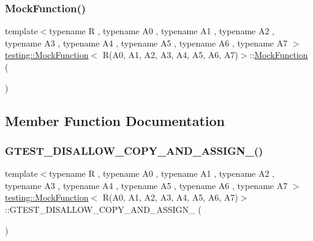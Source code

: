 \subsubsection{\texorpdfstring{MockFunction()}{MockFunction()}}
{\footnotesize\ttfamily template$<$typename R , typename A0 , typename A1 , typename A2 , typename A3 , typename A4 , typename A5 , typename A6 , typename A7 $>$ \\
\mbox{\hyperlink{classtesting_1_1_mock_function}{testing\+::\+Mock\+Function}}$<$ R(A0, A1, A2, A3, A4, A5, A6, A7)$>$\+::\mbox{\hyperlink{classtesting_1_1_mock_function}{Mock\+Function}} (\begin{DoxyParamCaption}{ }\end{DoxyParamCaption})\hspace{0.3cm}{\ttfamily [inline]}}



\subsection{Member Function Documentation}
\mbox{\label{classtesting_1_1_mock_function_3_01_r_07_a0_00_01_a1_00_01_a2_00_01_a3_00_01_a4_00_01_a5_00_01_a6_00_01_a7_08_4_a445a7908911449f9317225121af6a476}} 
\subsubsection{\texorpdfstring{GTEST\_DISALLOW\_COPY\_AND\_ASSIGN\_()}{GTEST\_DISALLOW\_COPY\_AND\_ASSIGN\_()}}
{\footnotesize\ttfamily template$<$typename R , typename A0 , typename A1 , typename A2 , typename A3 , typename A4 , typename A5 , typename A6 , typename A7 $>$ \\
\mbox{\hyperlink{classtesting_1_1_mock_function}{testing\+::\+Mock\+Function}}$<$ R(A0, A1, A2, A3, A4, A5, A6, A7)$>$\+::G\+T\+E\+S\+T\+\_\+\+D\+I\+S\+A\+L\+L\+O\+W\+\_\+\+C\+O\+P\+Y\+\_\+\+A\+N\+D\+\_\+\+A\+S\+S\+I\+G\+N\+\_\+ (\begin{DoxyParamCaption}\item[{\mbox{\hyperlink{classtesting_1_1_mock_function}{Mock\+Function}}$<$ R(A0, A1, A2, A3, A4, A5, A6, A7)$>$}]{ }\end{DoxyParamCaption})\hspace{0.3cm}{\ttfamily [private]}}

